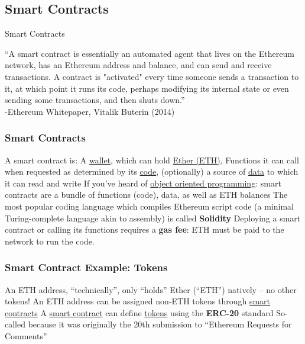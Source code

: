 \documentclass[]{beamer}
\begin{document}
\subsection{Smart Contracts}

\begin{frame}{Smart Contracts}

    ``A smart contract is essentially an automated agent that lives on the Ethereum network, has an Ethereum address and balance, and can send and receive transactions. A contract is "activated" every time someone sends a transaction to it, at which point it runs its code, perhaps modifying its internal state or even sending some transactions, and then shuts down.'' \\
 
-Ethereum Whitepaper, Vitalik Buterin (2014)
    
\end{frame}


\begin{frame}
\frametitle{Smart Contracts}

\bi
\m A smart contract is:
\bi
\m A \ul{wallet}, which can hold \ul{Ether (ETH)},
\m Functions it can call when requested as determined by its \ul{code},
\m (optionally) a source of \ul{data} to which it can read and write \pause 
\ei
\m If you've heard of \ul{object oriented programming}: smart contracts are a bundle of functions (code), data, as well as ETH balances \pause
\m The most popular coding language which compiles Ethereum script code (a minimal Turing-complete language akin to assembly) is called \textbf{Solidity} \pause 
\ei
Deploying a smart contract or calling its functions requires a \textbf{gas fee}: ETH must be paid to the network to run the code. 

\end{frame}

\begin{frame}
\frametitle{Smart Contract Example: Tokens}

\bi
\m An ETH address, ``technically'', only ``holds'' Ether (``ETH'') natively -- no other tokens!
\m An ETH address can be assigned non-ETH tokens through \ul{smart contracts}
\m A \ul{smart contract} can define \ul{tokens} using the \textbf{ERC-20} standard 
\bi 
\m So-called because it was originally the 20th submission to ``Ethereum Requests for Comments'' 
\ei 
\ei

\end{frame}
\end{document}
